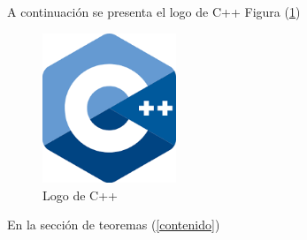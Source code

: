 \documentclass{article}
\begin{document}
\begin{lstlisting}

\end{lstlisting}

A continuación se presenta el logo de C++ Figura (\ref{fig:cpplogo})

\begin{figure}[h]
\includegraphics[width=4cm]{cpplogo.png}
\centering
\caption{Logo de C++}
\label{fig:cpplogo}
\end{figure}

En la sección de teoremas (\ref{contenido})



 

\end{document}
